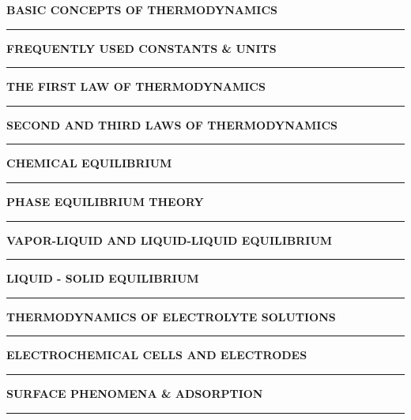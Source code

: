 \documentclass[8pt]{extarticle}
\begin{document}
\twocolumn


\vspace{0.5cm}
{\centering \textbf{\LARGE BASIC CONCEPTS OF THERMODYNAMICS} \par}

\hrule

\vspace{0.5cm}
{\centering \textbf{\LARGE FREQUENTLY USED CONSTANTS \& UNITS} \par}

\hrule

\vspace{0.5cm}
{\centering \textbf{\LARGE THE FIRST LAW OF THERMODYNAMICS} \par}

\hrule

\newpage
\vspace{0.5cm}
{\centering \textbf{\LARGE SECOND AND THIRD LAWS OF THERMODYNAMICS} \par}

\hrule

\vspace{0.5cm}
{\centering \textbf{\LARGE CHEMICAL EQUILIBRIUM} \par}

\hrule

\vspace{0.5cm}
{\centering \textbf{\LARGE PHASE EQUILIBRIUM THEORY} \par}

\hrule

\vspace{0.5cm}
{\centering \textbf{\LARGE VAPOR-LIQUID AND LIQUID-LIQUID EQUILIBRIUM} \par}

\hrule

\vspace{0.5cm}
{\centering \textbf{\LARGE LIQUID - SOLID EQUILIBRIUM} \par}

\hrule

\newpage
\vspace{0.5cm}
{\centering \textbf{\LARGE THERMODYNAMICS OF ELECTROLYTE SOLUTIONS} \par}

\hrule

\vspace{0.5cm}
{\centering \textbf{\LARGE ELECTROCHEMICAL CELLS AND ELECTRODES} \par}

\hrule

\vspace{0.5cm}
{\centering \textbf{\LARGE SURFACE PHENOMENA \& ADSORPTION} \par}

\hrule
\end{document}
